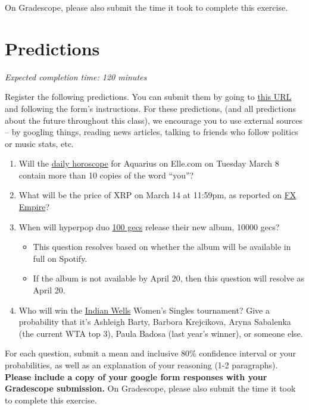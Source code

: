 \documentclass[11pt]{article}
\begin{document}
On Gradescope, please also submit the time it took to complete this exercise.

\section*{Predictions}

\emph{Expected completion time: 120 minutes}

Register the following predictions. You can submit them by going to \href{https://docs.google.com/forms/d/e/1FAIpQLSfGARO8mpj0GiFtOKuuVa9eBnkq6g2dTJU53qfqTmhQLDaZFg/viewform?usp=sf_link}{this URL} and following the form's instructions. For these predictions, (and all predictions about the future throughout this class), we encourage you to use external sources -- by googling things, reading news articles, talking to friends who follow politics or music stats, etc.

\begin{enumerate}
	\item Will the \href{https://www.elle.com/horoscopes/daily/a107/aquarius-daily-horoscope/}{daily horoscope} for Aquarius on Elle.com on Tuesday March 8 contain more than 10 copies of the word ``you''?
	\item What will be the price of XRP on March 14 at 11:59pm, as reported on \href{https://www.fxempire.com/crypto/xrp}{FX Empire}?
	\item When will hyperpop duo \href{https://en.wikipedia.org/wiki/100_Gecs}{100 gecs} release their new album, 10000 gecs?
	\begin{itemize}
		\item This question resolves based on whether the album will be available in full on Spotify.
		\item If the album is not available by April 20, then this question will resolve as April 20.
	\end{itemize}
	\item Who will win the \href{https://bnpparibasopen.com/players/current/?assoc=wta&type=singles}{Indian Wells} Women's Singles tournament? Give a probability that it's Ashleigh Barty, Barbora Krejcikova, Aryna Sabalenka (the current WTA top 3), Paula Badosa (last year's winner), or someone else.
\end{enumerate}

For each question, submit a mean and inclusive 80\% confidence interval or your probabilities, as well as an explanation of your reasoning (1-2 paragraphs). \textbf{Please include a copy of your google form responses with your Gradescope submission.} On Gradescope, please also submit the time it took to complete this exercise.
\end{document}
